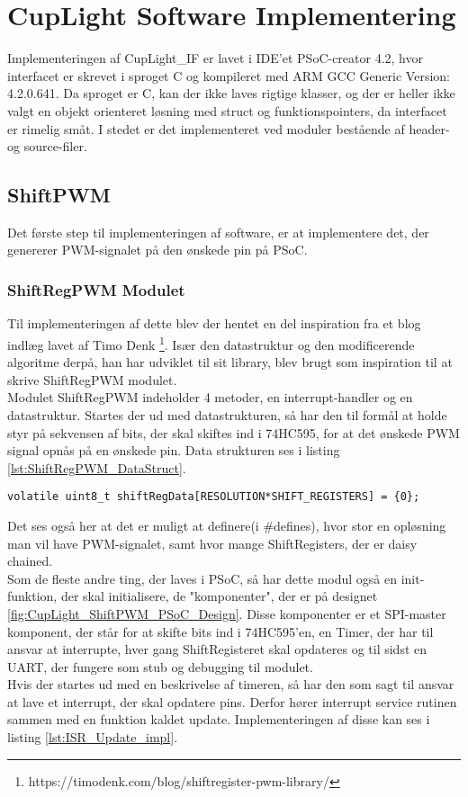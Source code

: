 \documentclass[Softwaredesign/Softwaredesign_main.tex]{subfiles}
\begin{document}
\section{CupLight Software Implementering}\label{sec:cuplight_sw_impl}
Implementeringen af CupLight\_IF er lavet i IDE'et PSoC-creator 4.2, hvor interfacet er skrevet i sproget C og kompileret med ARM GCC Generic Version: 4.2.0.641. Da sproget er C, kan der ikke laves rigtige klasser, og der er heller ikke valgt en objekt orienteret løsning med struct og funktionspointers, da interfacet er rimelig småt. I stedet er det implementeret ved moduler bestående af header- og source-filer.
\subsection{ShiftPWM}
Det første step til implementeringen af software, er at implementere det, der genererer PWM-signalet på den ønskede pin på PSoC. 
\subsubsection{ShiftRegPWM Modulet}
Til implementeringen af dette blev der hentet en del inspiration fra et blog indlæg lavet af Timo Denk \footnote{https://timodenk.com/blog/shiftregister-pwm-library/}. Især den datastruktur og den modificerende algoritme derpå,  han har udviklet til sit library, blev brugt som inspiration til at skrive ShiftRegPWM modulet. 
\\Modulet ShiftRegPWM indeholder 4 metoder, en interrupt-handler og en datastruktur. Startes der ud med datastrukturen, så har den  til formål at holde styr på sekvensen af bits, der skal skiftes ind i 74HC595, for at det ønskede PWM signal opnås på en ønskede pin. Data strukturen ses i listing \ref{lst:ShiftRegPWM_DataStruct}.

\begin{lstlisting}[caption={Datastruktur for ShiftRegPWM}, label={lst:ShiftRegPWM_DataStruct},
style=customc]
volatile uint8_t shiftRegData[RESOLUTION*SHIFT_REGISTERS] = {0};
\end{lstlisting}

Det ses også her at det er muligt at definere(i \#defines), hvor stor en opløsning man vil have PWM-signalet, samt hvor mange ShiftRegisters, der er daisy chained. 
\\Som de fleste andre ting, der laves i PSoC, så har dette modul også en init-funktion, der skal initialisere, de "komponenter", der er på designet \ref{fig:CupLight_ShiftPWM_PSoC_Design}. Disse komponenter er et SPI-master komponent, der står for at skifte bits ind i 74HC595'en, en Timer, der har til ansvar at interrupte, hver gang ShiftRegisteret skal opdateres og til sidst en UART, der fungere som stub og debugging til modulet.
\\Hvis der startes ud med en beskrivelse af timeren, så har den som sagt til ansvar at lave et interrupt, der skal opdatere pins. Derfor hører interrupt service rutinen sammen med en funktion kaldet update. Implementeringen af disse kan ses i listing \ref{lst:ISR_Update_impl}.
\end{document}
